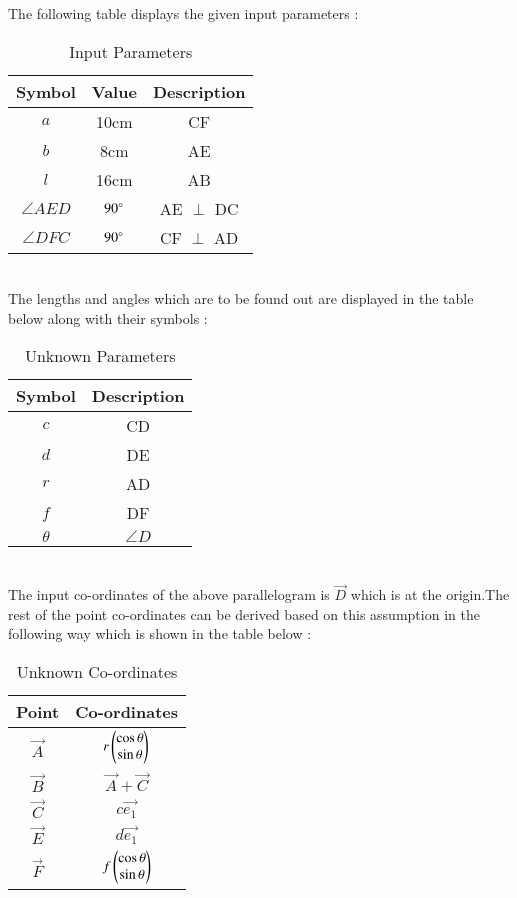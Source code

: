 The following table displays the given input parameters :\\
\begin{table}[h]
	\centering
\begin{tabular}{|c|c|c|}
\hline
Symbol & Value & Description\\
\hline
$a$ & 10cm & CF \\
\hline
$b$ & 8cm & AE \\
\hline
$l$ & 16cm & AB \\
\hline
$\angle{AED}$ & $90\degree$ & AE $\perp$ DC \\
\hline
$\angle{DFC}$ & $90\degree$ & CF $\perp$ AD \\
\hline
\end{tabular}
	\caption{Input Parameters}
	\label{tab:table1}
\end{table}\\
The lengths and angles which are to be found out are displayed in the table below along with their symbols :\\
\begin{table}[h]
	\centering
\begin{tabular}{|c|c|}
\hline
Symbol & Description \\
\hline
$c$ & CD \\
\hline
$d$ & DE \\
\hline
$r$ & AD \\
\hline
$f$ & DF \\
\hline
$\theta$ & $\angle{D}$\\
\hline
\end{tabular}
	\caption{Unknown Parameters}
	\label{tab:table2}
\end{table}\\
The input co-ordinates of the above parallelogram is $\vec{D}$ which is at the origin.The rest of the point co-ordinates can be derived based on this assumption in the following way which is shown in the table below :\\
\begin{table}[h]
	\centering
\begin{tabular}{|c|c|}
\hline
Point & Co-ordinates\\
\hline
$\vec{A}$ & $r\begin{pmatrix}\cos{\theta}\\\sin{\theta}\end{pmatrix}$ \\
\hline
$\vec{B}$ & $\vec{A} + \vec{C}$ \\
\hline
$\vec{C}$ & $c\vec{e_1}$\\
\hline
$\vec{E}$ & $d\vec{e_1}$ \\
\hline
$\vec{F}$ & $f\begin{pmatrix}\cos{\theta}\\\sin{\theta}\end{pmatrix}$ \\
\hline
\end{tabular}
	\caption{Unknown Co-ordinates}
	\label{tab:table3}
\end{table}\\

